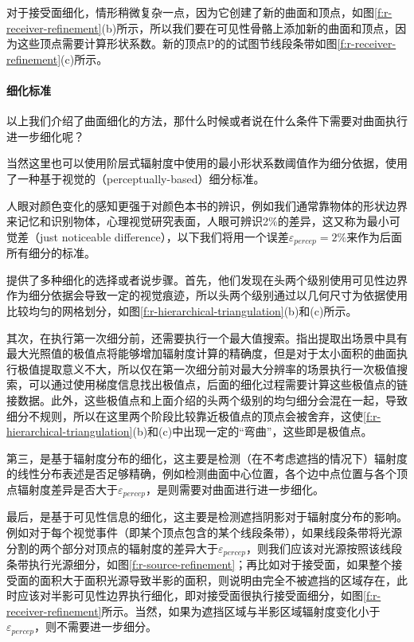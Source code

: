 对于接受面细化，情形稍微复杂一点，因为它创建了新的曲面和顶点，如图\ref{f:r-receiver-refinement}(b)所示，所以我们要在可见性骨骼上添加新的曲面和顶点，因为这些顶点需要计算形状系数。新的顶点P的的试图节线段条带如图\ref{f:r-receiver-refinement}(c)所示。



\paragraph{细化标准}
以上我们介绍了曲面细化的方法，那什么时候或者说在什么条件下需要对曲面执行进一步细化呢？

当然这里也可以使用阶层式辐射度中使用的最小形状系数阈值作为细分依据，\cite{a:FastandAccurateHierarchicalRadiosityUsingGlobalVisibility}使用了一种基于视觉的（perceptually-based）细分标准。

人眼对颜色变化的感知更强于对颜色本书的辨识，例如我们通常靠物体的形状边界来记忆和识别物体，心理视觉研究\cite{a:Perceptually-drivenradiosity,a:Colordisplaysandcolorscience}表面，人眼可辨识2\%的差异，这又称为最小可觉差（just noticeable difference），以下我们将用一个误差$\varepsilon_{percep}=2\%$来作为后面所有细分的标准。

\cite{a:FastandAccurateHierarchicalRadiosityUsingGlobalVisibility}提供了多种细化的选择或者说步骤。首先，他们发现在头两个级别使用可见性边界作为细分依据会导致一定的视觉痕迹，所以头两个级别通过以几何尺寸为依据使用比较均匀的网格划分，如图\ref{f:r-hierarchical-triangulation}(b)和(c)所示。

其次，在执行第一次细分前，还需要执行一个最大值搜索。\cite{a:Accurateandconsistentreconstructionofilluminationfunctionsusingstructuredsampling}指出提取出场景中具有最大光照值的极值点将能够增加辐射度计算的精确度，但是对于太小面积的曲面执行极值提取意义不大，所以仅在第一次细分前对最大分辨率的场景执行一次极值搜索，可以通过使用梯度信息找出极值点，后面的细化过程需要计算这些极值点的链接数据。此外，这些极值点和上面介绍的头两个级别的均匀细分会混在一起，导致细分不规则，所以在这里两个阶段比较靠近极值点的顶点会被舍弃，这使\ref{f:r-hierarchical-triangulation}(b)和(c)中出现一定的“弯曲”，这些即是极值点。

第三，是基于辐射度分布的细化，这主要是检测（在不考虑遮挡的情况下）辐射度的线性分布表述是否足够精确，例如检测曲面中心位置，各个边中点位置与各个顶点辐射度差异是否大于$\varepsilon_{percep}$，是则需要对曲面进行进一步细化。

最后，是基于可见性信息的细化，这主要是检测遮挡阴影对于辐射度分布的影响。例如对于每个视觉事件（即某个顶点包含的某个线段条带），如果线段条带将光源分割的两个部分对顶点的辐射度的差异大于$\varepsilon_{percep}$，则我们应该对光源按照该线段条带执行光源细分，如图\ref{f:r-source-refinement}；再比如对于接受面，如果整个接受面的面积大于面积光源导致半影的面积，则说明由完全不被遮挡的区域存在，此时应该对半影可见性边界执行细化，即对接受面很执行接受面细分，如图\ref{f:r-receiver-refinement}所示。当然，如果为遮挡区域与半影区域辐射度变化小于$\varepsilon_{percep}$，则不需要进一步细分。




